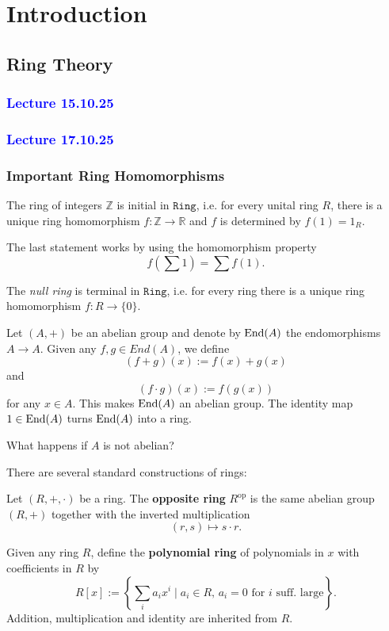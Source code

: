 \chapter{Introduction}
\section{Ring Theory}
\subsection{\textcolor{blue}{Lecture 15.10.25}}
\subsection{\textcolor{blue}{Lecture 17.10.25}}
\subsection*{Important Ring Homomorphisms}
\begin{theorem}
    The ring of integers $\mathbb{Z}$ is initial in $\mathtt{Ring}$, i.e. for every unital ring $R$, there is a unique ring homomorphism $f: \mathbb{Z} \to \mathbb{R}$ and $f$ is determined by $f(1)=1_R$.
\end{theorem}
The last statement works by using the homomorphism property \[
f(\sum 1)=\sum f(1)
.\] 
\begin{theorem}
    The \emph{null ring} is terminal in $\mathtt{Ring}$, i.e. for every ring there is a unique ring homomorphism $f: R \to \{0\}$.
\end{theorem}
\begin{eg}
    Let $(A,+)$ be an abelian group and denote by $\operatorname{End}(A)$ the endomorphisms $A \to A$. Given any $f,g \in End(A)$, we define \[
        (f+g)(x):=f(x)+g(x)
    \] and \[
    (f \cdot g)(x):=f(g(x))
\] for any $x \in A$. This makes $\operatorname{End}(A)$ an abelian group. The identity map $1 \in \operatorname{End}(A)$ turns $\operatorname{End}(A)$ into a ring. 
\end{eg}
\begin{ex}
   What happens if $A$ is not abelian?
\end{ex}
There are several standard constructions of rings:
\begin{definition}
    Let $(R,+,\cdot)$ be a ring. The \textbf{opposite ring} $R^\text{op}$ is the same abelian group $(R,+)$ together with the inverted multiplication \[
        (r,s) \mapsto s \cdot r
    .\] 
\end{definition}
\begin{definition}
    Given any ring $R$, define the \textbf{polynomial ring} of polynomials in $x$ with coefficients in $R$ by \[
        R[x]:= \left\{ \sum_i a_ix^i \mid a_i \in R,\, a_i=0 \text{ for }i \text{ suff. large}\right\} 
    .\]  Addition, multiplication and identity are inherited from $R$.
\end{definition}
